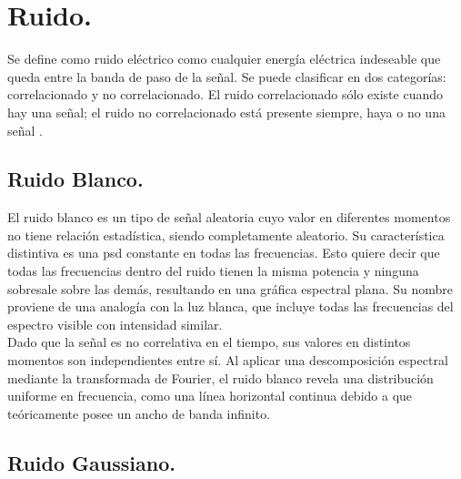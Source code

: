 \section*{\fontsize{12}{18}\selectfont Ruido.}

\begin{justify}
    Se define como ruido eléctrico como cualquier energía eléctrica indeseable que queda entre la banda
    de paso de la señal. Se puede clasificar en dos categorías: correlacionado y no correlacionado. El
    ruido correlacionado sólo existe cuando hay una señal; el ruido no correlacionado está presente siempre,
    haya o no una señal \parencite{tomasi2003sistemas}.
\end{justify}

\subsection*{\fontsize{12}{18}\selectfont Ruido Blanco.}

\begin{justify}
    El ruido blanco es un tipo de señal aleatoria cuyo valor en diferentes momentos no tiene relación estadística, siendo
    completamente aleatorio. Su característica distintiva es una \gls{psd} constante \parencite{haykin2008communication} en todas
    las frecuencias. Esto quiere decir que todas las frecuencias dentro del ruido tienen la misma potencia y ninguna sobresale
    sobre las demás, resultando en una gráfica espectral plana. Su nombre proviene de una analogía con la luz blanca, que incluye todas
    las frecuencias del espectro visible con intensidad similar. \\

    Dado que la señal es no correlativa en el tiempo, sus valores en distintos momentos son independientes entre sí. Al aplicar
    una descomposición espectral mediante la transformada de Fourier, el ruido blanco revela una distribución uniforme en frecuencia,
    como una línea horizontal continua debido a que teóricamente posee un ancho de banda infinito.
\end{justify}

\subsection*{\fontsize{12}{18}\selectfont Ruido Gaussiano.}

